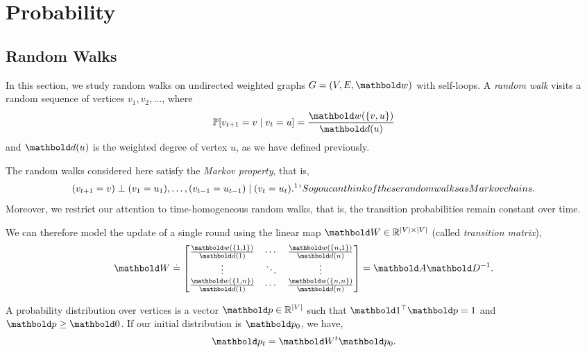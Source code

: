
\chapter{Probability}

\section{Random Walks}

In this section, we study random walks on undirected weighted graphs $G = (\sV, \sE, \vw)$ with self-loops. A \emph{random walk} visits a random sequence of vertices $v_1, v_2, \dots$, where \begin{align}
    \Pr{v_{t+1} = v \mid v_t = u} = \frac{\vw(\{v, u\})}{\vd(u)}
\end{align} and $\vd(u)$ is the weighted degree of vertex $u$, as we have defined previously.

\begin{rmk}
The random walks considered here satisfy the \emph{Markov property}, that is, \begin{align}
    (v_{t+1} = v) \perp (v_1 = u_1), \dots, (v_{t-1} = u_{t-1}) \mid (v_t = u_t).\safefootnote{So you can think of these random walks as Markov chains.}
\end{align} Moreover, we restrict our attention to time-homogeneous random walks, that is, the transition probabilities remain constant over time.
\end{rmk}

We can therefore model the update of a single round using the linear map $\mW \in \R^{|\sV|\times|\sV|}$ (called \emph{transition matrix}), \begin{align}
    \mW \defeq \begin{bmatrix}
    \frac{\vw(\{1,1\})}{\vd(1)} & \cdots & \frac{\vw(\{n, 1\})}{\vd(n)} \\
    \vdots & \ddots & \vdots \\
    \frac{\vw(\{1,n\})}{\vd(1)} & \cdots & \frac{\vw(\{n, n\})}{\vd(n)} \\
    \end{bmatrix} = \mA\inv{\mD}.
\end{align}

A probability distribution over vertices is a vector $\vp \in \R^{|\sV|}$ such that $\trans{\vOne}\vp = 1$ and $\vp \geq \vZero$. If our initial distribution is $\vp_0$, we have, \begin{align}
    \vp_t = \mW^t\vp_0.
\end{align}

